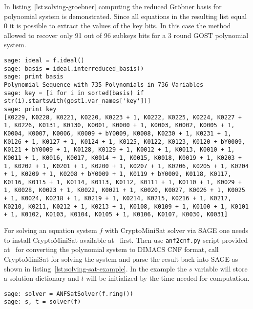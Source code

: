 In listing~\ref{lst:solving-groebner} computing the reduced
Gr\"obner basis for polynomial system is demonstrated. Since all equations in the resulting list
equal 0 it is possible to extract the values of the key bits. In this case the
method allowed to recover only 91 out of 96 subkeys bits for a 3 round GOST
polynomial system.
\begin{lstlisting}[label=lst:solving-groebner, caption=Solving equation system using reduced Gr\"obner basis]
sage: ideal = f.ideal()
sage: basis = ideal.interreduced_basis()
sage: print basis
Polynomial Sequence with 735 Polynomials in 736 Variables
sage: key = [i for i in sorted(basis) if str(i).startswith(gost1.var_names['key'])]
sage: print key
[K0229, K0228, K0221, K0220, K0223 + 1, K0222, K0225, K0224, K0227 + 1, K0226, K0131, K0130, K0001, K0000 + 1, K0003, K0002, K0005 + 1, K0004, K0007, K0006, K0009 + bY0009, K0008, K0230 + 1, K0231 + 1, K0126 + 1, K0127 + 1, K0124 + 1, K0125, K0122, K0123, K0120 + bY0009, K0121 + bY0009 + 1, K0128, K0129 + 1, K0012 + 1, K0013, K0010 + 1, K0011 + 1, K0016, K0017, K0014 + 1, K0015, K0018, K0019 + 1, K0203 + 1, K0202 + 1, K0201 + 1, K0200 + 1, K0207 + 1, K0206, K0205 + 1, K0204 + 1, K0209 + 1, K0208 + bY0009 + 1, K0119 + bY0009, K0118, K0117, K0116, K0115 + 1, K0114, K0113, K0112, K0111 + 1, K0110 + 1, K0029 + 1, K0028, K0023 + 1, K0022, K0021 + 1, K0020, K0027, K0026 + 1, K0025 + 1, K0024, K0218 + 1, K0219 + 1, K0214, K0215, K0216 + 1, K0217, K0210, K0211, K0212 + 1, K0213 + 1, K0108, K0109 + 1, K0100 + 1, K0101 + 1, K0102, K0103, K0104, K0105 + 1, K0106, K0107, K0030, K0031]
\end{lstlisting}

For solving an equation system $f$ with CryptoMiniSat solver via SAGE one needs to
install CryptoMiniSat available at~\cite{soos:cryptominisat} first. Then use
\verb+anf2cnf.py+ script provided at~\cite{anf2cnf} for converting the polynomial
system to DIMACS CNF format, call CryptoMiniSat for solving the system and
parse the result back into SAGE as shown in
listing~\ref{lst:solving-sat-example}. In the example the $s$ variable will
store a solution dictionary and $t$ will be initialized by the time needed for
computation.
\begin{lstlisting}[label=lst:solving-sat-example, caption=Solving equation system using SAT solver]
sage: solver = ANFSatSolver(f.ring())
sage: s, t = solver(f)
\end{lstlisting}

